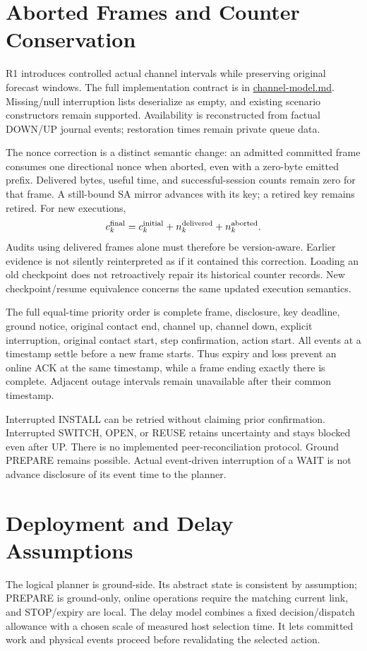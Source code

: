 \documentclass[11pt]{article}
\begin{document}
\section{Aborted Frames and Counter Conservation}
R1 introduces controlled actual channel intervals while preserving original forecast windows. The full implementation contract is in \href{../research-audit/channel-model.md}{channel-model.md}. Missing/null interruption lists deserialize as empty, and existing scenario constructors remain supported. Availability is reconstructed from factual DOWN/UP journal events; restoration times remain private queue data.

The nonce correction is a distinct semantic change: an admitted committed frame consumes one directional nonce when aborted, even with a zero-byte emitted prefix. Delivered bytes, useful time, and successful-session counts remain zero for that frame. A still-bound SA mirror advances with its key; a retired key remains retired. For new executions,
\[
 c_k^{\rm final}=c_k^{\rm initial}+n_k^{\rm delivered}+n_k^{\rm aborted}.
\]
Audits using delivered frames alone must therefore be version-aware. Earlier evidence is not silently reinterpreted as if it contained this correction. Loading an old checkpoint does not retroactively repair its historical counter records. New checkpoint/resume equivalence concerns the same updated execution semantics.

The full equal-time priority order is complete frame, disclosure, key deadline, ground notice, original contact end, channel up, channel down, explicit interruption, original contact start, step confirmation, action start. All events at a timestamp settle before a new frame starts. Thus expiry and loss prevent an online ACK at the same timestamp, while a frame ending exactly there is complete. Adjacent outage intervals remain unavailable after their common timestamp.

Interrupted INSTALL can be retried without claiming prior confirmation. Interrupted SWITCH, OPEN, or REUSE retains uncertainty and stays blocked even after UP. There is no implemented peer-reconciliation protocol. Ground PREPARE remains possible. Actual event-driven interruption of a WAIT is not advance disclosure of its event time to the planner.

\section{Deployment and Delay Assumptions}
The logical planner is ground-side. Its abstract state is consistent by assumption; PREPARE is ground-only, online operations require the matching current link, and STOP/expiry are local. The delay model combines a fixed decision/dispatch allowance with a chosen scale of measured host selection time. It lets committed work and physical events proceed before revalidating the selected action.
\end{document}
